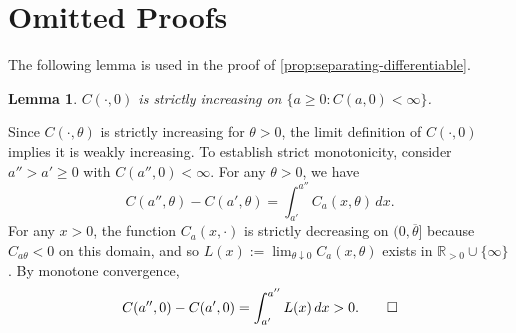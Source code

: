\documentclass[12 pt]{article}
\makeatletter
\newenvironment{proof}[1][Proof]{\noindent\textbf{#1} }{\ \rule{0.5em}{0.5em}}
\newtheorem{lemma}{Lemma}
\theoremstyle{remark}
\theoremstyle{definition}
\newcommand{\R}{\mathbb{R}}
\newcommand{\Rstrpos}{\R_{>0}}
\renewenvironment{proof}[1][\proofname] {\par\pushQED{\qed}\normalfont\topsep6\p@\@plus6\p@\relax\trivlist\item[\hskip\labelsep\bfseries#1\@addpunct{.}]\ignorespaces}{\popQED\endtrivlist\@endpefalse}
\makeatother
\begin{document}
\section{Omitted Proofs}
\label{sec:proof:separating-differentiable}

The following lemma is used in the proof of \autoref{prop:separating-differentiable}.

\begin{lemma}\label{lem:cost-type-zero}
$C(\cdot, 0)$ is strictly increasing on $\{a \geq 0 : C(a, 0) < \infty\}$.
\end{lemma}

\begin{proof}
Since $C(\cdot, \theta)$ is strictly increasing for $\theta > 0$, the limit definition of $C(\cdot, 0)$ implies it is weakly increasing. To establish strict monotonicity, consider $a'' > a' \geq 0$ with $C(a'', 0) < \infty$. For any $\theta > 0$, we have
\[
C(a'', \theta) - C(a', \theta) = \int_{a'}^{a''} C_a(x, \theta) \, dx.
\]
For any $x > 0$, the function $C_a(x, \cdot)$ is strictly decreasing on $(0,\overline \theta]$ because $C_{a \theta}<0$ on this domain, and so $L(x) := \lim_{\theta \downarrow 0} C_a(x, \theta)$ exists in $\Rstrpos \cup \{\infty\}$. By monotone convergence,
\[
C(a'', 0) - C(a', 0) = \int_{a'}^{a''} L(x) \, dx > 0. \qedhere
\]
\end{proof}
\end{document}
